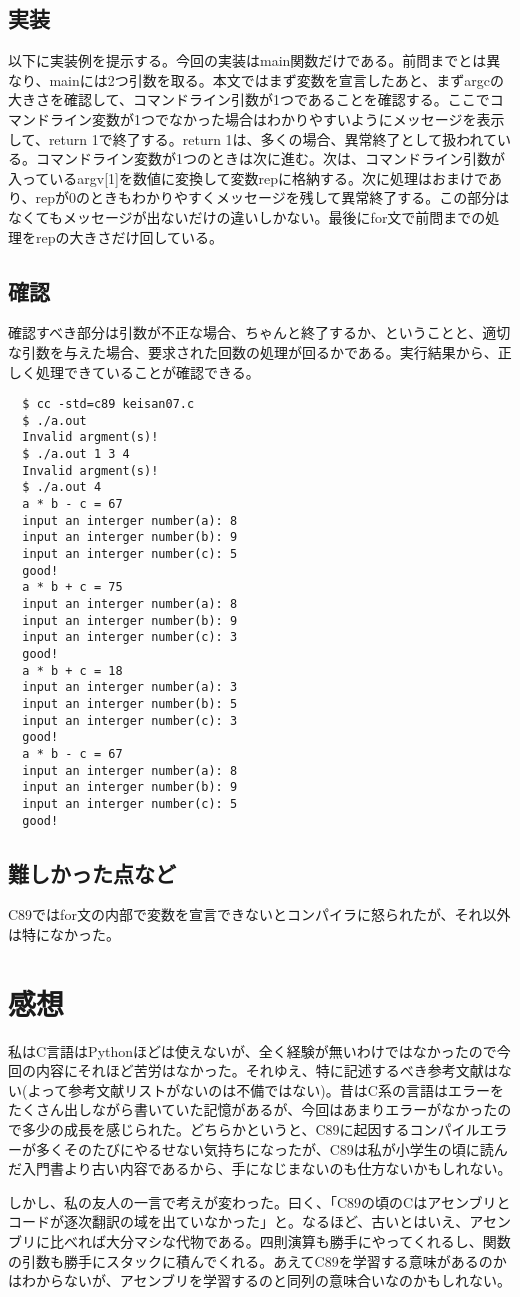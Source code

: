\documentclass[dvipdfmx,12pt,a4j]{jarticle}
\begin{document}
\subsection{実装}
以下に実装例を提示する。今回の実装はmain関数だけである。前問までとは異なり、mainには2つ引数を取る。本文ではまず変数を宣言したあと、まずargcの大きさを確認して、コマンドライン引数が1つであることを確認する。ここでコマンドライン変数が1つでなかった場合はわかりやすいようにメッセージを表示して、return 1で終了する。return 1は、多くの場合、異常終了として扱われている。コマンドライン変数が1つのときは次に進む。次は、コマンドライン引数が入っているargv[1]を数値に変換して変数repに格納する。次に処理はおまけであり、repが0のときもわかりやすくメッセージを残して異常終了する。この部分はなくてもメッセージが出ないだけの違いしかない。最後にfor文で前問までの処理をrepの大きさだけ回している。


\subsection{確認}
確認すべき部分は引数が不正な場合、ちゃんと終了するか、ということと、適切な引数を与えた場合、要求された回数の処理が回るかである。実行結果から、正しく処理できていることが確認できる。
\begin{verbatim}
  $ cc -std=c89 keisan07.c
  $ ./a.out
  Invalid argment(s)!
  $ ./a.out 1 3 4
  Invalid argment(s)!
  $ ./a.out 4
  a * b - c = 67
  input an interger number(a): 8
  input an interger number(b): 9
  input an interger number(c): 5
  good!
  a * b + c = 75
  input an interger number(a): 8
  input an interger number(b): 9
  input an interger number(c): 3
  good!
  a * b + c = 18
  input an interger number(a): 3
  input an interger number(b): 5
  input an interger number(c): 3
  good!
  a * b - c = 67
  input an interger number(a): 8
  input an interger number(b): 9
  input an interger number(c): 5
  good!
\end{verbatim}

\subsection{難しかった点など}
C89ではfor文の内部で変数を宣言できないとコンパイラに怒られたが、それ以外は特になかった。

\section{感想}
私はC言語はPythonほどは使えないが、全く経験が無いわけではなかったので今回の内容にそれほど苦労はなかった。それゆえ、特に記述するべき参考文献はない(よって参考文献リストがないのは不備ではない)。昔はC系の言語はエラーをたくさん出しながら書いていた記憶があるが、今回はあまりエラーがなかったので多少の成長を感じられた。どちらかというと、C89に起因するコンパイルエラーが多くそのたびにやるせない気持ちになったが、C89は私が小学生の頃に読んだ入門書より古い内容であるから、手になじまないのも仕方ないかもしれない。

しかし、私の友人の一言で考えが変わった。曰く、「C89の頃のCはアセンブリとコードが逐次翻訳の域を出ていなかった」と。なるほど、古いとはいえ、アセンブリに比べれば大分マシな代物である。四則演算も勝手にやってくれるし、関数の引数も勝手にスタックに積んでくれる。あえてC89を学習する意味があるのかはわからないが、アセンブリを学習するのと同列の意味合いなのかもしれない。
\end{document}
